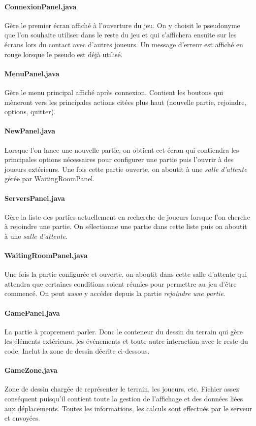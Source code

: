 \documentclass[a4paper,12pt]{report}
\begin{document}
\paragraph{ConnexionPanel.java}
Gère le premier écran affiché à l'ouverture du jeu. On y choisit le pseudonyme que l'on souhaite utiliser dans le reste du jeu et qui s'affichera ensuite sur les écrans lors du contact avec d'autres joueurs. Un message d'erreur est affiché en rouge lorsque le pseudo est déjà utilisé.
\paragraph{MenuPanel.java}
Gère le menu principal affiché après connexion. Contient les boutons qui mèneront vers les principales actions citées plus haut (nouvelle partie, rejoindre, options, quitter).
\paragraph{NewPanel.java}
Lorsque l'on lance une nouvelle partie, on obtient cet écran qui contiendra les principales options nécessaires pour configurer une partie puis l'ouvrir à des joueurs extérieurs. Une fois cette partie ouverte, on aboutit à une \emph{salle d'attente} gérée par WaitingRoomPanel.
\paragraph{ServersPanel.java}
Gère la liste des parties actuellement en recherche de joueurs lorsque l'on cherche à rejoindre une partie. On sélectionne une partie dans cette liste puis on aboutit à une \emph{salle d'attente}.
\paragraph{WaitingRoomPanel.java}
Une fois la partie configurée et ouverte, on aboutit dans cette salle d'attente qui attendra que certaines conditions soient réunies pour permettre au jeu d'être commencé. On peut \emph{aussi} y accéder depuis la partie \emph{rejoindre une partie}.
\paragraph{GamePanel.java}
La partie à proprement parler. Donc le conteneur du dessin du terrain qui gère les éléments extérieurs, les événements et toute autre interaction avec le reste du code. Inclut la zone de dessin décrite ci-dessous.
\paragraph{GameZone.java}
Zone de dessin chargée de représenter le terrain, les joueurs, etc. Fichier assez conséquent puisqu'il contient toute la gestion de l'affichage et des données liées aux déplacements. Toutes les informations, les calculs sont effectués par le serveur et envoyées.
\end{document}
